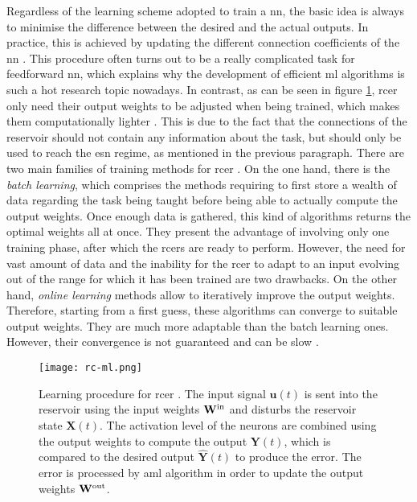 Regardless of the learning scheme adopted to train a \gls{nn}, the basic idea is always to minimise the difference between the desired and the actual outputs. In practice, this is achieved by updating the different connection coefficients of the \gls{nn} \cite[p.233]{bishop2006pattern}\cite[p.733]{russell2010artificial}. This procedure often turns out to be a really complicated task for feedforward \gls{nn}, which explains why the development of efficient \gls{ml} algorithms is such a hot research topic nowadays. In contrast, as can be seen in figure \ref{rc-ml}, \gls{rcer} only need their output weights to be adjusted when being trained, which makes them computationally lighter \cite{Jaeger2004}. This is due to the fact that the connections of the reservoir should not contain any information about the task, but should only be used to reach the \gls{esn} regime, as mentioned in the previous paragraph. There are two main families of training methods for \gls{rcer} \cite{Jaeger2002}. On the one hand, there is the \textit{batch learning}, which comprises the methods requiring to first store a wealth of data regarding the task being taught before being able to actually compute the output weights. Once enough data is gathered, this kind of algorithms returns the optimal weights all at once. They present the advantage of involving only one training phase, after which the \glspl{rcer} are ready to perform. However, the need for vast amount of data and the inability for the \gls{rcer} to adapt to an input evolving out of the range for which it has been trained are two drawbacks. On the other hand, \textit{online learning} methods allow to iteratively improve the output weights. Therefore, starting from a first guess, these algorithms can converge to suitable output weights. They are much more adaptable than the batch learning ones. However, their convergence is not guaranteed and can be slow \cite{JaegerTraining, schrauwen}.

\begin{figure}[h]
	\centering
	\texttt{[image: rc-ml.png]}
	\caption{Learning procedure for \acrlong{rcer} \cite{Goudarzi2014ACS}. The input signal $\mathbf{u}(t)$ is sent into the reservoir using the input weights $\mathbf{W}^{\text{in}}$ and disturbs the reservoir state $\mathbf{X}(t)$. The activation level of the neurons are combined using the output weights to compute the output $\mathbf{Y}(t)$, which is compared to the desired output $\hat{\mathbf{Y}}(t)$ to produce the error. The error is processed by a\gls{ml} algorithm in order to update the output weights $\mathbf{W}^{\text{out}}$.}
	\label{rc-ml}
\end{figure}

